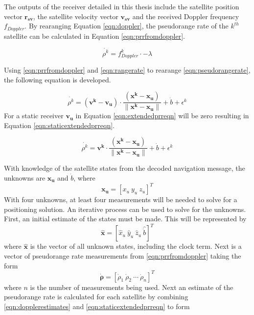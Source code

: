 \documentclass[12pt]{report}
\begin{document}
The outputs of the receiver detailed in this thesis include the satellite position vector $\mathbf{r_{sv}}$, the satellite velocity vector $\mathbf{v_{sv}}$ and the received Doppler frequency $f_{Doppler}$. By rearanging Equation \ref{eqn:doppler}, the pseudorange rate of the $k^{th}$ satellite can be calculated in Equation \ref{eqn:prrfromdoppler}.

\begin{equation}
    \dot{\rho^{k}} = f_{Doppler}^{k} \cdot -\lambda
    \label{eqn:prrfromdoppler}
\end{equation}

Using \ref{eqn:prrfromdoppler} and \ref{eqn:rangerate} to rearange \ref{eqn:pseudorangerate}, the following equation is developed.

\begin{equation}
    \dot{\rho^{k}} = (\mathbf{v^{k}} - \mathbf{v_u}) \cdot \frac{(\mathbf{x^k} - \mathbf{x_u})}{\| \mathbf{x^k} - \mathbf{x_u}\|} + \dot{b} + \epsilon^{k}
    \label{eqn:extendedprreqn}
\end{equation}
For a static receiver $\mathbf{v_u}$ in Equation \ref{eqn:extendedprreqn} will be zero resulting in Equation \ref{eqn:staticextendedprreqn}.

\begin{equation}
    \dot{\rho^{k}} = \mathbf{v^{k}} \cdot \frac{(\mathbf{x^k} - \mathbf{x_u})}{\| \mathbf{x^k} - \mathbf{x_u}\|} + \dot{b} + \epsilon^{k}
    \label{eqn:staticextendedprreqn}
\end{equation}

With knowledge of the satellite states from the decoded navigation message, the unknowns are $\mathbf{x_u}$ and $\dot{b}$, where
\begin{equation}
\mathbf{x_u} = 
        [x_u \: y_u \: z_u]^T 
\end{equation}
With four unknowns, at least four measurements will be needed to solve for a positioning solution. An iterative process can be used to solve for the unknowns. 
First, an initial estimate of the states must be made. This will be represented by
\begin{equation}
    \mathbf{\hat{x}} = 
       [ \hat{x}_u \:
        \hat{y}_u \:
        \hat{z}_u \:
        \hat{\dot{b}}]^T
    \label{eqn:dopplerestimates}
\end{equation}
where $\mathbf{\hat{x}}$ is the vector of all unknown states, including the clock term.
Next is a vector of pseudorange rate measurements from \ref{eqn:prrfromdoppler} taking the form
\begin{equation}
\mathbf{\dot{\rho}} = 
    [\dot{\rho}_1 \:
    \dot{\rho}_2 \:
    \cdots \:
    \dot{\rho}_n]^T
\end{equation}
where $n$ is the number of measurements being used. Next an estimate of the pseudorange rate is calculated for each satellite by combining \ref{eqn:dopplerestimates} and \ref{eqn:staticextendedprreqn} to form 
\end{document}
